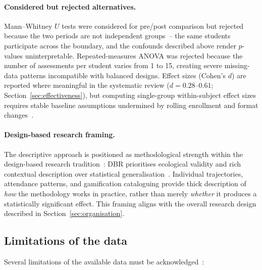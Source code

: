 \paragraph{Considered but rejected alternatives.}
Mann--Whitney $U$ tests were considered for pre/post comparison but rejected because the two periods are not independent groups~-- the same students participate across the boundary, and the confounds described above render $p$-values uninterpretable. Repeated-measures ANOVA was rejected because the number of assessments per student varies from 1 to 15, creating severe missing-data patterns incompatible with balanced designs. Effect sizes (Cohen's $d$) are reported where meaningful in the systematic review ($d=0.28$--$0.61$; Section~\ref{sec:effectiveness}), but computing single-group within-subject effect sizes requires stable baseline assumptions undermined by rolling enrollment and format changes~\cite{CohenManionMorrison2018}.

\paragraph{Design-based research framing.}
The descriptive approach is positioned as methodological strength within the design-based research tradition~\cite{Bakker2018, WangHannafin2005}: DBR prioritises ecological validity and rich contextual description over statistical generalisation~\cite{AndersonShattuck2012}. Individual trajectories, attendance patterns, and gamification cataloguing provide thick description of \emph{how} the methodology works in practice, rather than merely \emph{whether} it produces a statistically significant effect. This framing aligns with the overall research design described in Section~\ref{sec:organisation}.

\subsection{Limitations of the data}

Several limitations of the available data must be acknowledged~\cite{creswell, ary}:

